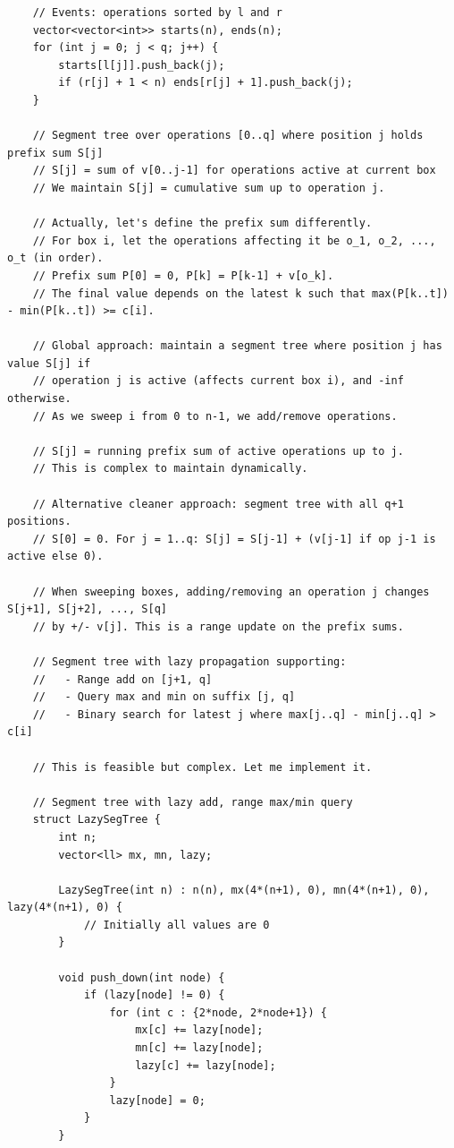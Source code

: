 \documentclass[11pt,a4paper]{article}
\begin{document}
\begin{lstlisting}
    // Events: operations sorted by l and r
    vector<vector<int>> starts(n), ends(n);
    for (int j = 0; j < q; j++) {
        starts[l[j]].push_back(j);
        if (r[j] + 1 < n) ends[r[j] + 1].push_back(j);
    }

    // Segment tree over operations [0..q] where position j holds prefix sum S[j]
    // S[j] = sum of v[0..j-1] for operations active at current box
    // We maintain S[j] = cumulative sum up to operation j.

    // Actually, let's define the prefix sum differently.
    // For box i, let the operations affecting it be o_1, o_2, ..., o_t (in order).
    // Prefix sum P[0] = 0, P[k] = P[k-1] + v[o_k].
    // The final value depends on the latest k such that max(P[k..t]) - min(P[k..t]) >= c[i].

    // Global approach: maintain a segment tree where position j has value S[j] if
    // operation j is active (affects current box i), and -inf otherwise.
    // As we sweep i from 0 to n-1, we add/remove operations.

    // S[j] = running prefix sum of active operations up to j.
    // This is complex to maintain dynamically.

    // Alternative cleaner approach: segment tree with all q+1 positions.
    // S[0] = 0. For j = 1..q: S[j] = S[j-1] + (v[j-1] if op j-1 is active else 0).

    // When sweeping boxes, adding/removing an operation j changes S[j+1], S[j+2], ..., S[q]
    // by +/- v[j]. This is a range update on the prefix sums.

    // Segment tree with lazy propagation supporting:
    //   - Range add on [j+1, q]
    //   - Query max and min on suffix [j, q]
    //   - Binary search for latest j where max[j..q] - min[j..q] > c[i]

    // This is feasible but complex. Let me implement it.

    // Segment tree with lazy add, range max/min query
    struct LazySegTree {
        int n;
        vector<ll> mx, mn, lazy;

        LazySegTree(int n) : n(n), mx(4*(n+1), 0), mn(4*(n+1), 0), lazy(4*(n+1), 0) {
            // Initially all values are 0
        }

        void push_down(int node) {
            if (lazy[node] != 0) {
                for (int c : {2*node, 2*node+1}) {
                    mx[c] += lazy[node];
                    mn[c] += lazy[node];
                    lazy[c] += lazy[node];
                }
                lazy[node] = 0;
            }
        }


\end{lstlisting}
\end{document}

